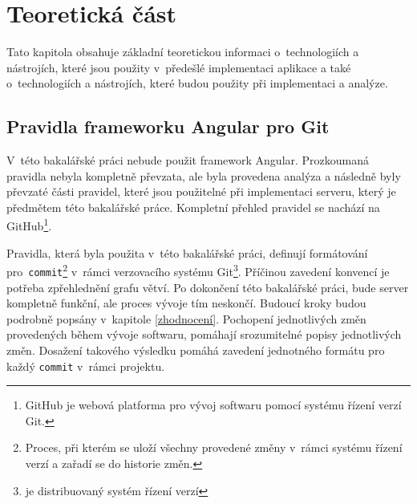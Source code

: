 %
\chapter{Teoretická část}\label{chapter:resere}
Tato kapitola obsahuje základní teoretickou informaci o~technologiích a nástrojích, které jsou použity v~předešlé implementaci aplikace a také o~technologiích a nástrojích, které budou použity při implementaci a analýze.

\section{Pravidla frameworku Angular pro Git}\label{reserse:git}
    V~této bakalářské práci nebude použit framework Angular. Prozkoumaná pravidla nebyla kompletně převzata, ale byla provedena analýza a následně byly převzaté části pravidel, které jsou použitelné při implementaci serveru, který je předmětem této bakalářské práce. Kompletní přehled pravidel se nachází na GitHub\footnote{ GitHub je webová platforma pro vývoj softwaru pomocí systému řízení verzí Git.}\cite{angular-git}.
    
    Pravidla, která byla použita v~této bakalářské práci, definují formátování pro~\verb|commit|\footnote{Proces, při kterém se uloží všechny provedené změny v~rámci systému řízení verzí a zařadí se do historie změn.} v~rámci verzovacího systému Git\footnote{je distribuovaný systém řízení verzí}. Příčinou zavedení konvencí je potřeba zpřehlednění grafu větví. Po dokončení této bakalářské práci, bude server kompletně funkční, ale proces vývoje tím neskončí. Budoucí kroky budou podrobně popsány v~kapitole \ref{zhodnocení}. Pochopení jednotlivých změn provedených během vývoje softwaru, pomáhají srozumitelné popisy jednotlivých změn. Dosažení takového výsledku pomáhá zavedení jednotného formátu pro každý \verb|commit| v~rámci projektu.
    
